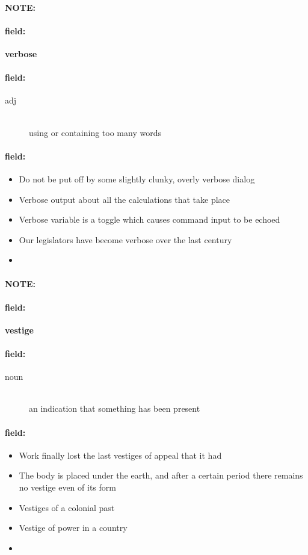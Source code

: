 \documentclass[12pt]{article}
\newenvironment{note}{\paragraph{NOTE:}}{}
\newenvironment{field}{\paragraph{field:}}{}
\begin{document}
\begin{note}
\begin{field}
\textbf{\large verbose}
\end{field}


\begin{field}
\begin{description}
\item[adj] \hfill \\ 
using or containing too many words

\end{description}
\end{field}

\begin{field}
\begin{itemize}
\item Do not be put off by some slightly clunky, overly verbose dialog
\item Verbose output about all the calculations that take place
\item Verbose variable is a toggle which causes command input to be echoed
\item Our legislators have become verbose over the last century
\item 
\end{itemize}
\end{field}
\end{note}
\begin{note}
\begin{field}
\textbf{\large vestige}
\end{field}


\begin{field}
\begin{description}
\item[noun] \hfill \\ 
an indication that something has been present

\end{description}
\end{field}

\begin{field}
\begin{itemize}
\item Work finally lost the last vestiges of appeal that it had
\item The body is placed under the earth, and after a certain period there remains no vestige even of its form
\item Vestiges of a colonial past
\item Vestige of power in a country
\item 
\end{itemize}
\end{field}
\end{note}
\end{document}
